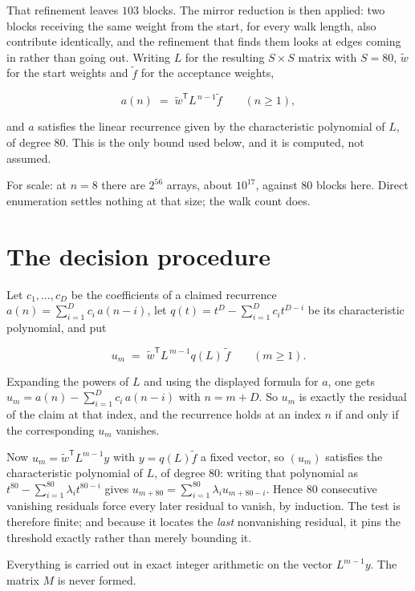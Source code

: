 \documentclass[11pt]{article}
\theoremstyle{definition}
\begin{document}
That refinement leaves $103$ blocks. The mirror reduction is then applied: two blocks receiving the same weight from the start, for every walk length, also contribute identically, and the refinement that finds them looks at edges coming in rather than going out. Writing $L$ for the resulting $S \times S$ matrix with $S = 80$, $\tilde w$ for the start weights and $\tilde f$ for the acceptance weights,

\[a(n) \;=\; \tilde w^{\mathsf T} L^{\,n-1} \tilde f \qquad (n \ge 1),\]

and $a$ satisfies the linear recurrence given by the characteristic polynomial of $L$, of degree $80$. This is the only bound used below, and it is computed, not assumed.

For scale: at $n = 8$ there are $2^{56}$ arrays, about $10^{17}$, against $80$ blocks here. Direct enumeration settles nothing at that size; the walk count does.

\section{The decision procedure}

Let $c_1,\dots,c_D$ be the coefficients of a claimed recurrence $a(n) = \sum_{i=1}^{D} c_i\,a(n-i)$, let $q(t) = t^{D} - \sum_{i=1}^{D} c_i t^{D-i}$ be its characteristic polynomial, and put

\[u_m \;=\; \tilde w^{\mathsf T} L^{\,m-1} q(L)\,\tilde f \qquad (m \ge 1).\]

Expanding the powers of $L$ and using the displayed formula for $a$, one gets $u_m = a(n) - \sum_{i=1}^{D} c_i\,a(n-i)$ with $n = m + D$. So $u_m$ is exactly the residual of the claim at that index, and the recurrence holds at an index $n$ if and only if the corresponding $u_m$ vanishes.

Now $u_m = \tilde w^{\mathsf T} L^{m-1} y$ with $y = q(L)\tilde f$ a fixed vector, so $(u_m)$ satisfies the characteristic polynomial of $L$, of degree $80$: writing that polynomial as $t^{80} - \sum_{i=1}^{80} \lambda_i t^{80-i}$ gives $u_{m+80} = \sum_{i=1}^{80} \lambda_i u_{m+80-i}$. Hence $80$ consecutive vanishing residuals force every later residual to vanish, by induction. The test is therefore finite; and because it locates the {\itshape last} nonvanishing residual, it pins the threshold exactly rather than merely bounding it.

Everything is carried out in exact integer arithmetic on the vector $L^{m-1}y$. The matrix $M$ is never formed.
\end{document}
